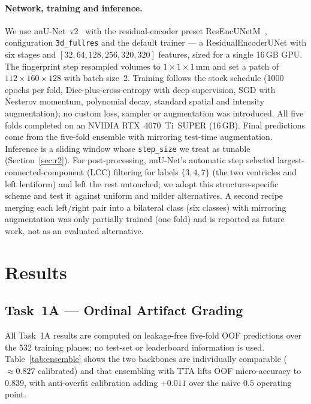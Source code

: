 \documentclass[runningheads]{llncs}
\begin{document}
\paragraph{Network, training and inference.}
We use nnU-Net~v2~\cite{isensee2021nnunet} with the residual-encoder preset
ResEncUNetM~\cite{isensee2024revisited}, configuration \texttt{3d\_fullres} and
the default trainer --- a ResidualEncoderUNet with six stages and
$[32,64,128,256,320,320]$ features, sized for a single 16\,GB GPU. The
fingerprint step resampled volumes to $1\times1\times1$\,mm and set a patch of
$112\times160\times128$ with batch size~2. Training follows the stock schedule
(1000 epochs per fold, Dice-plus-cross-entropy with deep supervision, SGD with
Nesterov momentum, polynomial decay, standard spatial and intensity
augmentation); no custom loss, sampler or augmentation was introduced. All five
folds completed on an NVIDIA RTX~4070~Ti~SUPER (16\,GB). Final predictions come
from the five-fold ensemble with mirroring test-time augmentation. Inference is a
sliding window whose \texttt{step\_size} we treat as tunable
(Section~\ref{sec:r2}). For post-processing, nnU-Net's automatic step selected
largest-connected-component (LCC) filtering for labels $\{3,4,7\}$ (the two
ventricles and left lentiform) and left the rest untouched; we adopt this
structure-specific scheme and test it against uniform and milder alternatives. A
second recipe merging each left/right pair into a bilateral class (six classes)
with mirroring augmentation was only partially trained (one fold) and is reported
as future work, not as an evaluated alternative.

\FloatBarrier
\section{Results}
\label{sec:results}

\subsection{Task~1A --- Ordinal Artifact Grading}
\label{sec:r1a}

All Task~1A results are computed on leakage-free five-fold OOF predictions over
the 532 training planes; no test-set or leaderboard information is used.
Table~\ref{tab:ensemble} shows the two backbones are individually comparable
($\approx0.827$ calibrated) and that ensembling with TTA lifts OOF micro-accuracy
to 0.839, with anti-overfit calibration adding $+0.011$ over the naive $0.5$
operating point.
\end{document}
